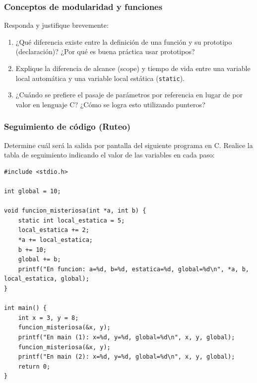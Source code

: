 \begin{ejercicioClase}
    \subsubsection{Conceptos de modularidad y funciones}
    Responda y justifique brevemente:
    \begin{enumerate}[label=\alph*)]
        \item ¿Qué diferencia existe entre la definición de una función y su prototipo (declaración)? ¿Por qué es buena práctica usar prototipos?
        \item Explique la diferencia de alcance (scope) y tiempo de vida entre una variable local automática y una variable local estática (\texttt{static}).
        \item ¿Cuándo se prefiere el pasaje de parámetros por referencia en lugar de por valor en lenguaje C? ¿Cómo se logra esto utilizando punteros?
    \end{enumerate}

    \subsubsection{Seguimiento de código (Ruteo)}
    Determine cuál será la salida por pantalla del siguiente programa en C. Realice la tabla de seguimiento indicando el valor de las variables en cada paso:
    \begin{lstlisting}[style=customc, basicstyle=\ttfamily\small]
#include <stdio.h>

int global = 10;

void funcion_misteriosa(int *a, int b) {
    static int local_estatica = 5;
    local_estatica += 2;
    *a += local_estatica;
    b += 10;
    global += b;
    printf("En funcion: a=%d, b=%d, estatica=%d, global=%d\n", *a, b, local_estatica, global);
}

int main() {
    int x = 3, y = 8;
    funcion_misteriosa(&x, y);
    printf("En main (1): x=%d, y=%d, global=%d\n", x, y, global);
    funcion_misteriosa(&x, y);
    printf("En main (2): x=%d, y=%d, global=%d\n", x, y, global);
    return 0;
}
    \end{lstlisting}


\end{ejercicioClase}
